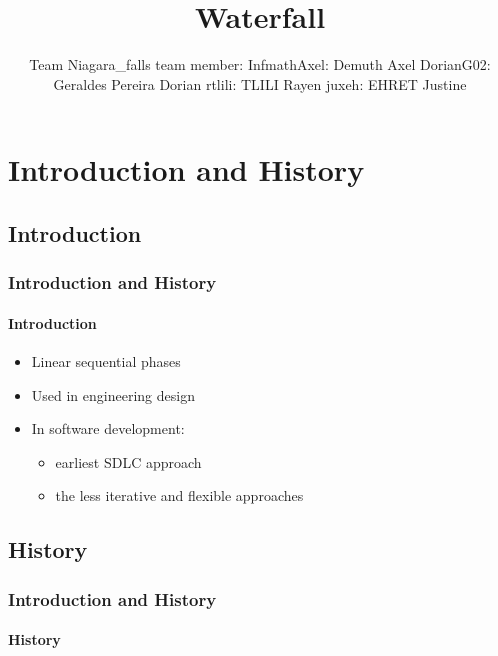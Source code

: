 \documentclass[10pt]{beamer}
\title{Waterfall}
\author{Team Niagara\_falls \newline\newline team member: \newline\newline InfmathAxel: Demuth Axel \newline DorianG02: Geraldes Pereira Dorian \newline rtlili: TLILI Rayen \newline juxeh: EHRET Justine}
\date{}
\begin{document}
\frame{\titlepage}
\begin{frame}
    \tableofcontents
\end{frame}



\section{Introduction and History}
\subsection{Introduction}
\begin{frame}
\frametitle{Introduction and History}
\framesubtitle{Introduction}
\begin{itemize}
    \item Linear sequential phases
    \item Used in engineering design
    \item In software development: 
    \begin{itemize}
        \item earliest SDLC approach
        \item the less iterative and flexible approaches
    \end{itemize}    
\end{itemize}
\end{frame}

\subsection{History}
\begin{frame}
\frametitle{Introduction and History}
\framesubtitle{History}
\startchronology
[startyear=1950,stopyear=1990]
\stopchronology
    
\end{frame}


\end{document}
